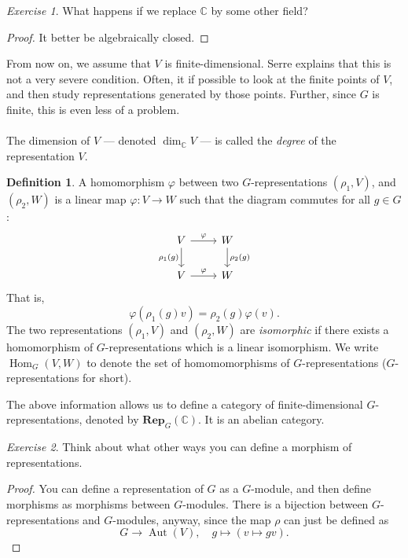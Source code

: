 \documentclass[a4paper]{report}
\theoremstyle{definition}
\newtheorem{definition}{Definition}
\theoremstyle{remark}
\theoremstyle{proposition}
\theoremstyle{conjecture}
\theoremstyle{lemma}
\theoremstyle{corollary}
\theoremstyle{exercise}
\newtheorem{exercise}{Exercise}
\theoremstyle{example}
\newcommand{\C}{\mathbb{C}}
\newcommand{\on}{\operatorname}
\begin{document}
\begin{exercise}
    What happens if we replace $\C$ by some other field?
\end{exercise}

\begin{proof}
    It better be algebraically closed.
\end{proof}

From now on, we assume that $V$ is finite-dimensional. Serre explains that 
this is not a very severe condition. Often, it if possible to look at the 
finite points of $V$, and then study representations generated by those points. 
Further, since $G$ is finite, this is even less of a problem. \\\\
The dimension of $V$ --- denoted $\dim_\C V$ --- is called the \emph{degree} 
of the representation $V$.

\begin{definition}
    A homomorphism $\varphi$ between two $G$-representations $(\rho_1,V)$,
    and $(\rho_2,W)$ is a linear map $\varphi: V \to W$ such that 
    the diagram commutes for all $g \in G$:
    $$\begin{tikzcd}
        V \arrow[r, "\varphi"] \arrow[d, "\rho_1(g)"'] & W \arrow[d, "\rho_2(g)"] \\
        V \arrow[r, "\varphi"]                         & W                       
        \end{tikzcd}$$
    That is, $$\varphi(\rho_1(g)v) = \rho_2(g)\varphi(v).$$
    The two representations $(\rho_1,V)$ and $(\rho_2,W)$ are \emph{isomorphic}
    if there exists a homomorphism of $G$-representations which is a linear 
    isomorphism. We write $\on{Hom}_G(V,W)$ to denote the set of 
    homomomorphisms of $G$-representations ($G$-representations for short).
\end{definition}

The above information allows us to define a category of finite-dimensional 
$G$-representations, denoted by $\mathbf{Rep}_G(\C)$. It is an abelian category. 

\begin{exercise}
    Think about what other ways you can define a morphism of representations.
\end{exercise}

\begin{proof}
    You can define a representation of $G$ as a $G$-module, and then define
    morphisms as morphisms between $G$-modules. There is a bijection between 
    $G$-representations and $G$-modules, anyway, since the map 
    $\rho$ can just be defined as 
    $$G \longrightarrow \on{Aut}(V), \quad g\longmapsto (v\longmapsto gv).$$
\end{proof}
\end{document}
